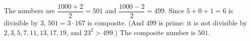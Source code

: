 The numbers are $\dfrac{1000+2}{2}=501$ and $\dfrac{1000-2}{2}=499$. Since $5+0+1=6$ is divisible by $3$, $501=3\cdot167$ is composite. (And $499$ is prime: it is not divisible by $2,3,5,7,11,13,17,19$, and $23^2>499$.) The composite number is $\boxed{501}$.
